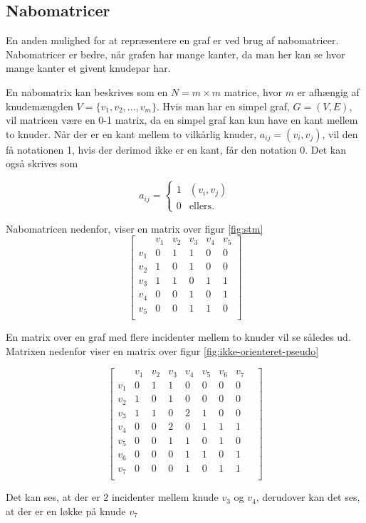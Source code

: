 \subsection{Nabomatricer}
En anden mulighed for at repræsentere en graf er ved brug af nabomatricer. Nabomatricer er bedre, når grafen har mange kanter, da man her kan se hvor mange kanter et givent knudepar har.

En nabomatrix kan beskrives som en $N=m \times m$ matrice, hvor $m$ er afhængig af knudemængden $V=\{v_1, v_2, \ldots, v_m\}$. Hvis man har en simpel graf, $G=(V,E)$, vil matricen være en 0-1 matrix, da en simpel graf kan kun have en kant mellem to knuder. Når der er en kant mellem to  vilkårlig knuder, $a_{ij}=(v_i,v_j)$,  vil den få notationen 1, hvis der derimod ikke er en kant, får den notation 0.
Det kan også skrives som

\[ a_{ij} = \left\{ \begin{array}{ll}
         1 & (v_i, v_j)\\
        0 & \mbox{ellers}.\end{array} \right. \]


Nabomatricen nedenfor, viser en matrix over figur \ref{fig:stm}
\begin{equation}
	\begin{bmatrix}
		&v_1&v_2&v_3&v_4&v_5 \\
		v_1&0&1&1&0&0 \\
		v_2&1&0&1&0&0 \\
		v_3&1&1&0&1&1 \\
		v_4&0&0&1&0&1 \\
		v_5&0&0&1&1&0 \\
	\end{bmatrix}
\end{equation}

En matrix over en graf med flere incidenter mellem to knuder vil se således ud. Matrixen nedenfor viser en matrix over figur \ref{fig:ikke-orienteret-pseudo} 

\begin{equation}
	\begin{bmatrix}
	&v_1&v_2&v_3&v_4&v_5&v_6&v_7& \\
	v_1&0&1&1&0&0&0&0 \\
	v_2&1&0&1&0&0&0&0 \\
	v_3&1&1&0&2&1&0&0 \\
	v_4&0&0&2&0&1&1&1 \\
	v_5&0&0&1&1&0&1&0 \\
	v_6&0&0&0&1&1&0&1 \\
	v_7&0&0&0&1&0&1&1 \\	
	\end{bmatrix}
\end{equation}

Det kan ses, at der er 2 incidenter mellem knude $v_3$ og $v_4$, derudover kan det ses, at der er en løkke på knude $v_7$

